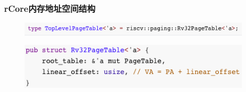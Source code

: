 \begin{frame}[fragile]
    \frametitle{rCore内存地址空间结构}
    \begin{figure}
    \includegraphics[width=0.8\linewidth]{figs/TopLevelPageTable.png}
    \end{figure}


    \begin{figure}
    \includegraphics[width=0.6\linewidth]{figs/Rv32PageTable.png}
    \end{figure}


\end{frame}

